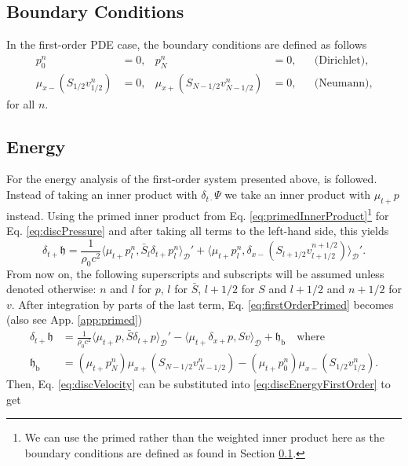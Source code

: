 \documentclass[dvipsnames]{article}
\def\dxp{\delta_{x+}}
\def\dxm{\delta_{x-}}
\def\Sbar{\bar S_l}
\begin{document}
\subsection{Boundary Conditions}\label{sec:boundariesFirstOrder}
In the first-order PDE case, the boundary conditions are defined as follows
\begin{align*}
    p_0^n &= 0, & p_N^n &= 0, & &\text{(Dirichlet),}\\
    \mu_{x-}(S_{1/2}v_{1/2}^n) &= 0, & \mu_{x+}(S_{N-1/2}v_{N-1/2}^n) &= 0, & &\text{(Neumann)},
\end{align*}
for all $n$.

\subsection{Energy}
For the energy analysis of the first-order system presented above, \cite{Harrison2018} is followed. Instead of taking an inner product with $\delta_{t\cdot}\Psi$ we take an inner product with $\mu_{t+}p$ instead. Using the primed inner product from Eq. \eqref{eq:primedInnerProduct}\footnote{We can use the primed rather than the weighted inner product here as the boundary conditions are defined as found in Section \ref{sec:boundariesFirstOrder}.} for Eq. \eqref{eq:discPressure} and after taking all terms to the left-hand side, this yields
\begin{equation}\label{eq:firstOrderPrimed}
    \delta_{t+}\mathfrak{h} = \frac{1}{\rho_0 c^2}\langle \mu_{t+}p_l^n, \Sbar \delta_{t+}p_l^n \rangle_{\mathcal{D}}' +\langle \mu_{t+}p_l^n, \dxm(S_{l+1/2}v_{l+1/2}^{n+1/2})\rangle_{\mathcal{D}}'.
\end{equation}
From now on, the following superscripts and subscripts will be assumed unless denoted otherwise: $n$ and $l$ for $p$, $l$ for $\bar S$, $l+1/2$ for $S$ and $l+1/2$ and $n+1/2$ for $v$. After integration by parts of the last term, Eq.  \eqref{eq:firstOrderPrimed} becomes (also see App. \ref{app:primed})
\begin{align}\label{eq:discEnergyFirstOrder}
    \delta_{t+}\mathfrak{h} &= \frac{1}{\rho_0 c^2}\langle \mu_{t+}p, \bar S \delta_{t+}p \rangle_{\mathcal{D}}' -\langle \mu_{t+}\dxp p, Sv\rangle_{\underline{\mathcal{D}}} + \mathfrak{h}_\text{b} \quad \text{where}\\
    \mathfrak{h}_\text{b} &= (\mu_{t+}p_N^n)\mu_{x+}(S_{N-1/2}v_{N-1/2}^n)-(\mu_{t+}p_0^n)\mu_{x-}(S_{1/2}v_{1/2}^n).\nonumber
\end{align}
Then, Eq. \eqref{eq:discVelocity} can be substituted into \eqref{eq:discEnergyFirstOrder} to get
\end{document}
